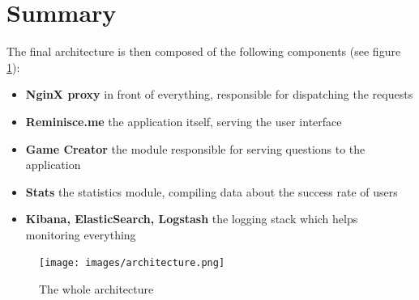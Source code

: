 \section{Summary}
The final architecture is then composed of the following components (see figure \ref{fig:architecture}):
\begin{itemize}
	\item \textbf{NginX proxy} in front of everything, responsible for dispatching the requests
	\item \textbf{Reminisce.me} the application itself, serving the user interface
	\item \textbf{Game Creator} the module responsible for serving questions to the application
	\item \textbf{Stats} the statistics module, compiling data about the success rate of users
	\item \textbf{Kibana, ElasticSearch, Logstash} the logging stack which helps monitoring everything
\end{itemize}
\begin{figure}
\centering
{\texttt{[image: images/architecture.png]}}
\caption{The whole architecture}
\label{fig:architecture}
\end{figure}